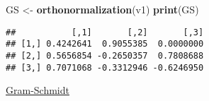 \documentclass[
]{article}
\newenvironment{Shaded}{\begin{snugshade}}{\end{snugshade}}
\newcommand{\FunctionTok}[1]{\textcolor[rgb]{0.13,0.29,0.53}{\textbf{#1}}}
\newcommand{\NormalTok}[1]{#1}
\newcommand{\OtherTok}[1]{\textcolor[rgb]{0.56,0.35,0.01}{#1}}
\begin{document}
\begin{Shaded}
\begin{Highlighting}[]
\NormalTok{GS }\OtherTok{\textless{}{-}} \FunctionTok{orthonormalization}\NormalTok{(v1)}
\FunctionTok{print}\NormalTok{(GS)}
\end{Highlighting}
\end{Shaded}

\begin{verbatim}
##           [,1]       [,2]       [,3]
## [1,] 0.4242641  0.9055385  0.0000000
## [2,] 0.5656854 -0.2650357  0.7808688
## [3,] 0.7071068 -0.3312946 -0.6246950
\end{verbatim}

\href{https://cran.r-project.org/web/packages/matlib/vignettes/gramreg.html}{Gram-Schmidt}
\end{document}
